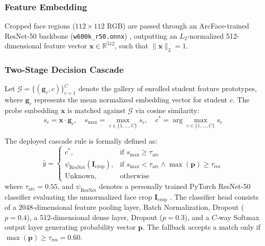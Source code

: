 \documentclass[conference]{IEEEtran}
\begin{document}
\subsubsection{Feature Embedding}
Cropped face regions ($112 \times 112$ RGB) are passed through an ArcFace-trained ResNet-50 backbone (\texttt{w600k\_r50.onnx}) \cite{deng2019arcface}, outputting an $L_2$-normalized 512-dimensional feature vector $\mathbf{x} \in \mathbb{R}^{512}$, such that $\|\mathbf{x}\|_2 = 1$.

\subsubsection{Two-Stage Decision Cascade}
Let $\mathcal{G} = \{(\mathbf{g}_c, c)\}_{c=1}^{C}$ denote the gallery of enrolled student feature prototypes, where $\mathbf{g}_c$ represents the mean normalized embedding vector for student $c$. The probe embedding $\mathbf{x}$ is matched against $\mathcal{G}$ via cosine similarity:
\begin{equation}
s_c = \mathbf{x} \cdot \mathbf{g}_c, \quad s_{\max} = \max_{c \in \{1,\dots,C\}} s_c, \quad c^* = \arg\max_{c \in \{1,\dots,C\}} s_c
\end{equation}

The deployed cascade rule is formally defined as:
\begin{equation}
\hat{y} = \begin{cases}
c^*, & \text{if } s_{\max} \ge \tau_{\text{arc}} \\
\psi_{\text{ResNet}}(\mathbf{I}_{\text{crop}}), & \text{if } s_{\max} < \tau_{\text{arc}} \land \max(\mathbf{p}) \ge \tau_{\text{res}} \\
\text{Unknown}, & \text{otherwise}
\end{cases}
\end{equation}
where $\tau_{\text{arc}} = 0.55$, and $\psi_{\text{ResNet}}$ denotes a personally trained PyTorch ResNet-50 classifier evaluating the unnormalized face crop $\mathbf{I}_{\text{crop}}$ \cite{he2016deep}. The classifier head consists of a 2048-dimensional feature pooling layer, Batch Normalization, Dropout ($p=0.4$), a 512-dimensional dense layer, Dropout ($p=0.3$), and a $C$-way Softmax output layer generating probability vector $\mathbf{p}$. The fallback accepts a match only if $\max(\mathbf{p}) \ge \tau_{\text{res}} = 0.60$.
\end{document}
